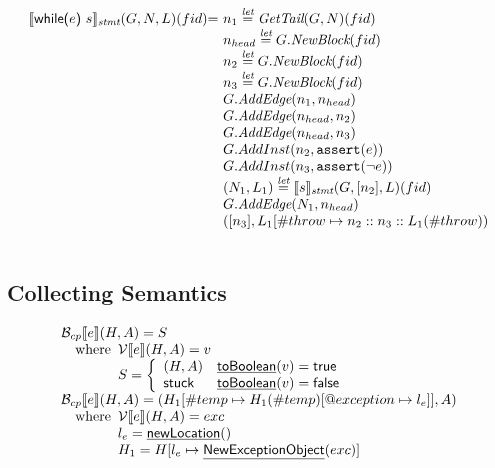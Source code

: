 \documentclass{article}
\newcommand{\lbr}{\ensuremath{\llbracket}}
\newcommand{\rbr}{\ensuremath{\rrbracket}}
\newcommand{\chf}[1]{\underline{\sf #1}}
\def\inred{\color{red}}
\newcommand{\SF}[1]{\mbox{\textsf{#1}}}
\newcommand{\TT}[1]{\mbox{\texttt{#1}}}
\newcommand{\wherec}[1]{{\rm where}\begin{array}[t]{l}#1\end{array}}
\newcommand{\B}{\mathcal{B}}
\newcommand{\V}{\mathcal{V}}
\newcommand{\vtrue}{\SF{true}}
\newcommand{\vfalse}{\SF{false}}
\newcommand{\transfun}[1]{\ensuremath{\lbr #1 \rbr}}
\newcommand{\ircfgwhile}[2]{\textsf{while(} #1 \textsf{)} \ #2}
\newcommand{\letval}{\overset{\emph{let}}{=}}
\newcommand{\GetTail}{\emph{GetTail}}
\def\inred{\color{red}}
\begin{document}
\[
\begin{array}{l@{}l@{~}l}
\transfun{\ircfgwhile{e}{s}}_{\emph{stmt}}(G,N,L)(fid) & = &
	n_1 \letval \GetTail(G,N)(fid)\\
	& & n_{head} \letval G.\emph{NewBlock}(fid)\\
	& & n_2 \letval G.\emph{NewBlock}(fid)\\
	& & n_3 \letval G.\emph{NewBlock}(fid)\\
	& & G.\emph{AddEdge}(n_1,n_{head})\\
	& & G.\emph{AddEdge}(n_{head},n_2)\\
	& & G.\emph{AddEdge}(n_{head},n_3)\\
	& & G.AddInst(n_2, \TT{assert}(e))\\
	& & G.AddInst(n_3, \TT{assert}(\neg e))\\
	& & (N_1,L_1) \letval \transfun{s}_{\emph{stmt}}(G,[n_2],L)(fid)\\
	& & G.\emph{AddEdge}(N_1,n_{head})\\
	& & ([n_3],L_1[\#throw \mapsto n_2::n_3::L_1(\#throw)) \\
	& & \\
\end{array}
\]

\newpage
\subsection{Collecting Semantics}
\[
\begin{array}{ll}

\B_{cp} \lbr e \rbr(H,A)
 = S \\
\quad\wherec{
  \V \lbr e \rbr(H, A) = v\\
  S=\left\{
    \begin{array}{ll}
      (H, A) & \chf{toBoolean}(v) = \vtrue \\
      {\sf stuck} & \chf{toBoolean}(v) = \vfalse \\
    \end{array}
  \right.
}
\\
\B_{cp} \lbr e \rbr(H,A) 
 = (H_1[\#temp \mapsto H_1(\#temp)[@exception \mapsto l_e]], A) \\
\quad\wherec{
   \V \lbr e \rbr(H, A) = exc\\
   l_e = \chf{newLocation}() \\
   H_1=H[l_e\mapsto\chf{NewExceptionObject}(exc)] \\
}

\end{array}
\]
\newpage
\end{document}
